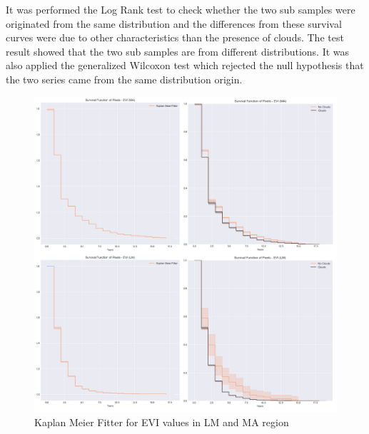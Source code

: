 It was performed the Log Rank test \citep{Peto_1972} to check whether the two sub samples were originated from the same distribution and the differences from these survival curves were due to other characteristics than the presence of clouds. The test result showed that the two sub samples are from different distributions. It was also applied the generalized Wilcoxon test \citep{lee_wang_2003} which rejected the null hypothesis that the two series came from the same distribution origin. 

\begin{figure}[H]
  \centering
  \includegraphics[width=1\textwidth]{KM_EVI.png}
\caption{Kaplan Meier Fitter for EVI values in LM and MA region}
\label{fig:km-evi}
\end{figure}

